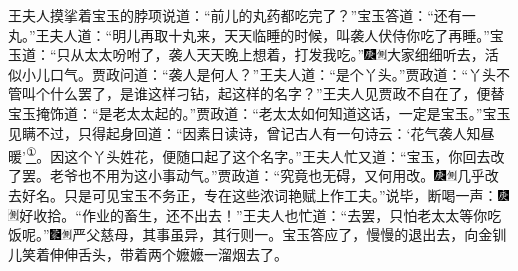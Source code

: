王夫人摸挲着宝玉的脖项说道：``前儿的丸药都吃完了？''宝玉答道：``还有一丸。''王夫人道：``明儿再取十丸来，天天临睡的时候，叫袭人伏侍你吃了再睡。''宝玉道：``只从太太吩咐了，袭人天天晚上想着，打发我吃。''{\includegraphics[width=3mm]{../Images/00004}\includegraphics[width=3mm]{../Images/00011}\footnotesize \kaishu 大家细细听去，活似小儿口气。}贾政问道：``袭人是何人？''王夫人道：``是个丫头。''贾政道：``丫头不管叫个什么罢了，是谁这样刁钻，起这样的名字？''王夫人见贾政不自在了，便替宝玉掩饰道：``是老太太起的。''贾政道：``老太太如何知道这话，一定是宝玉。''宝玉见瞒不过，只得起身回道：``因素日读诗，曾记古人有一句诗云：`花气袭人知昼暖'\href{../Text/part0027_split_000.html\#lnkback_1_a}{\textsuperscript{①}}。因这个丫头姓花，便随口起了这个名字。''王夫人忙又道：``宝玉，你回去改了罢。老爷也不用为这小事动气。''贾政道：``究竟也无碍，又何用改。{\includegraphics[width=3mm]{../Images/00004}\includegraphics[width=3mm]{../Images/00011}\footnotesize \kaishu 几乎改去好名。}只是可见宝玉不务正，专在这些浓词艳赋上作工夫。''说毕，断喝一声：{\includegraphics[width=3mm]{../Images/00004}\includegraphics[width=3mm]{../Images/00011}\footnotesize \kaishu 好收拾。}``作业的畜生，还不出去！''王夫人也忙道：``去罢，只怕老太太等你吃饭呢。''{\includegraphics[width=3mm]{../Images/00006}\includegraphics[width=3mm]{../Images/00011}\footnotesize \kaishu 严父慈母，其事虽异，其行则一。}宝玉答应了，慢慢的退出去，向金钏儿笑着伸伸舌头，带着两个嬷嬷一溜烟去了。

